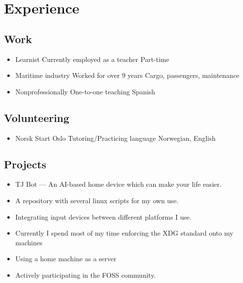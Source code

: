 \documentclass{curriculum}
\begin{document}
	\section{Experience}	
	\begin{half}
	\subsection{Work}
		\begin{itemize}
		\item Learnist
			\subitem Currently employed as a teacher
			\subitem Part-time
		\item Maritime industry
			\subitem Worked for over 9 years
			\subitem Cargo, passengers, maintenance
		\item Nonprofessionally
			\subitem One-to-one teaching
			\subitem Spanish
		\end{itemize}
	\subsection{Volunteering}
		\begin{itemize}
			\item Norsk Start Oslo
				\subitem Tutoring/Practicing language
				\subitem Norwegian, English 
		\end{itemize}
	\end{half}
	\begin{half}
	\subsection{Projects}
		\begin{itemize}
			\item TJ Bot --- An AI-based home device which can make your life easier.
			\item A repository with several linux scripts for my own use.
			\item Integrating input devices between different platforms I use.
			\item Currently I spend most of my time enforcing the XDG standard onto my machines
			\item Using a home machine as a server
			\item Actively participating in the FOSS community.
		\end{itemize}
	\end{half}
\end{document}
